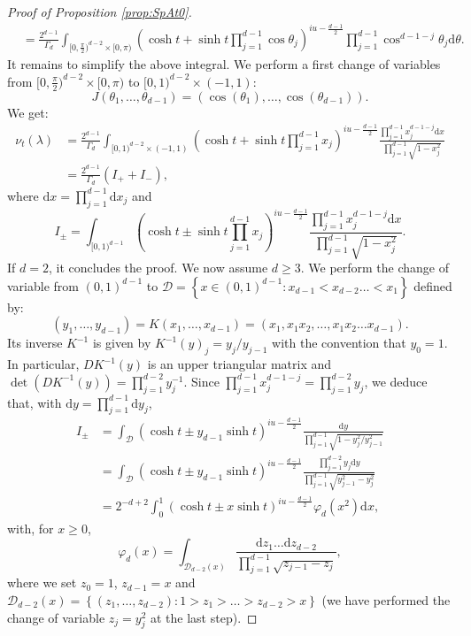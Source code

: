\documentclass[]{scrartcl}
\renewcommand{\d}{\mathrm{d}}
\numberwithin{equation}{section}
\numberwithin{figure}{section}
\begin{document}
\begin{proof}[Proof of Proposition \ref{prop:SpAt0}]
\begin{align*}
		&=  \frac{2^{d-1}}{\Gamma_d} \int_{[0, \frac{\pi}{2})^{d-2}\times[0, \pi)}\left(\cosh t + \sinh t\prod_{j=1}^{d-1} \cos \theta_j\right)^{iu-\frac{d-1}{2}} \prod_{j = 1}^{d-1} \cos^{d-1-j}\theta_j \d\theta.
	\end{align*}
	It remains to simplify the above integral. We perform a first change of variables from $[0, \frac{\pi}{2})^{d-2}\times[0, \pi)$ to $[0,1)^{d-2} \times (-1,1)$: $$ J (\theta_1,\dots,\theta_{d-1}) = (\cos (\theta_1), \dots,\cos(\theta_{d-1})).$$  We get: 
	\begin{align*}
		\nu_t (\lambda)  & = \frac{2^{d-1}}{\Gamma_d}  \int_{[0, 1)^{d-2}\times(-1, 1)}\left(\cosh t + \sinh t\prod_{j=1}^{d-1} x_j\right)^{iu-\frac{d-1}{2}}  \frac{ \prod_{j = 1}^{d-1} x_j^{d-1-j} \d x}{\prod_{j=1}^{d-1} \sqrt{1 - x_j^2}} \\
		&= \frac{2^{d-1}}{\Gamma_d} \left( I_+ + I_- \right),
	\end{align*}
	where $\d x = \prod_{j=1}^{d-1} \d x_j$ and
	$$
	I_{\pm} = \int_{[0, 1)^{d-1}}\left(\cosh t \pm \sinh t\prod_{j=1}^{d-1} x_j\right)^{iu-\frac{d-1}{2}}  \frac{ \prod_{j = 1}^{d-1} x_j^{d-1-j} \d x}{\prod_{j=1}^{d-1} \sqrt{1 - x_j^2}}.
	$$
	If $d =2$, it concludes the proof. We now assume $d\geq 3$. We perform the change of variable from $(0,1)^{d-1}$ to $\mathcal D = \left\{ x \in (0,1)^{d-1} : x_{d-1} < x_{d-2} \dots < x_1 \right\}$  defined by:
	$$
	(y_1,\dots,y_{d-1}) = K(x_1,\dots,x_{d-1}) = (x_1,x_1 x_2, \dots, x_{1} x_2 \dots x_{d-1}).
	$$
	Its inverse $K^{-1}$ is given by $K^{-1} (y)_j = y_{j}/y_{j-1}$ with the convention that $y_0 = 1$. In particular, $ D K^{-1} (y)$ is an upper triangular matrix and $\det ( D K^{-1} (y) ) = \prod_{j=1}^{d-2} y_{j}^{-1}$. Since $\prod_{j=1}^{d-1} x_j^{d-1-j}   = \prod_{j=1}^{d-2} y_j$, we deduce that, with $\d y = \prod_{j=1}^{d-1} \d y_j$,
	\begin{align*}
		I_{\pm} & = \int_{\mathcal D}\left(\cosh t \pm y_{d-1} \sinh t \right)^{iu-\frac{d-1}{2}}  \frac{   \d y}{\prod_{j=1}^{d-1} \sqrt{1 - y_j^2/y_{j-1}^2 }} \\
		& = \int_{\mathcal D}\left(\cosh t \pm y_{d-1} \sinh t \right)^{iu-\frac{d-1}{2}}  \frac{  \prod_{j=1}^{d-2} y_{j}  \d y}{\prod_{j=1}^{d-1} \sqrt{y_{j-1}^2  - y_j^2}} \\
		& =  2^{-d+2}  \int_{0}^1 \left(\cosh t \pm x \sinh t \right)^{iu-\frac{d-1}{2}} \varphi_d (x^2) \d x,
	\end{align*}
	with, for $x \geq 0$,
	$$
	\varphi_d (x) = \int_{\mathcal D_{d-2} (x)}  \frac{ \d z_1 \dots \d z_{d-2} }{\prod_{j=1}^{d-1} \sqrt{z_{j-1}  - z_j}} ,
	$$
	where we set $z_0 = 1$, $z_{d-1} = x$ and $\mathcal D_{d-2} (x) = \left\{ (z_1,\dots,z_{d-2}) : 1 > z_1 > \dots > z_{d-2} > x \right\}$ (we have performed the change of variable $z_j = y_j^2$ at the last step). 


\end{proof}
\end{document}
